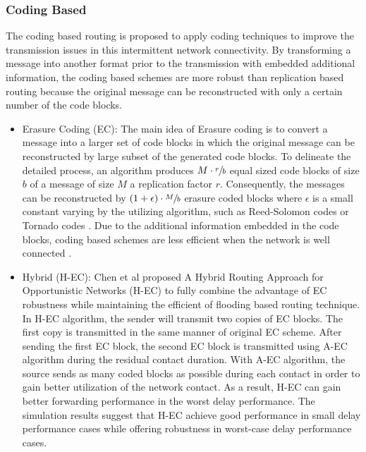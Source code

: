 \subsubsection{Coding Based}
\label{bg:Opportunistic Networks:Classification of Opportunistic Routing:CB}
The coding based routing is proposed to apply coding techniques to improve the transmission issues in this intermittent network connectivity.
By transforming a message into another format prior to the transmission with embedded additional information, the coding based schemes are more robust than replication based routing because the original message can be reconstructed with only a certain number of the code blocks.
	\begin{itemize}
		\item Erasure Coding (EC):
		The main idea of Erasure coding \cite{Wang2005} is to convert a message into a larger set of code blocks in which the original message can be reconstructed by large subset of the generated code blocks.
		To delineate the detailed process, an algorithm produces $ M \cdot \sfrac{r}{b}$ equal sized code blocks of size $b$ of	a message of size $M$ a replication factor $r$.
		Consequently, the messages can be reconstructed by  $(1+\epsilon) \cdot \sfrac{M}{b}$ erasure coded blocks where $\epsilon$ is a small constant 
		varying by the utilizing algorithm, such as Reed-Solomon codes or Tornado codes \cite{Chung2003}.
		Due to the additional information embedded in the code blocks, coding based schemes are less efficient when the network is well connected \cite{Yu2006}.

		\item Hybrid (H-EC):
		Chen et al \cite{Chen2006} proposed A Hybrid Routing Approach for Opportunistic Networks (H-EC) to fully combine the advantage of EC robustness while maintaining the efficient of flooding based routing technique. 
		In H-EC algorithm, the sender will transmit two copies of EC blocks. 
		The first copy is transmitted in the same manner of original EC scheme.
		After sending the first EC block, the second EC block is transmitted using A-EC algorithm during the residual contact duration. 
		With A-EC algorithm, the source sends as many coded blocks as possible during each contact in order to gain better utilization of the network contact.
		As a result, H-EC can gain better forwarding performance in the worst delay performance.
		The simulation results suggest that H-EC achieve good performance in small delay performance cases while offering robustness in worst-case delay performance cases.
	\end{itemize}



